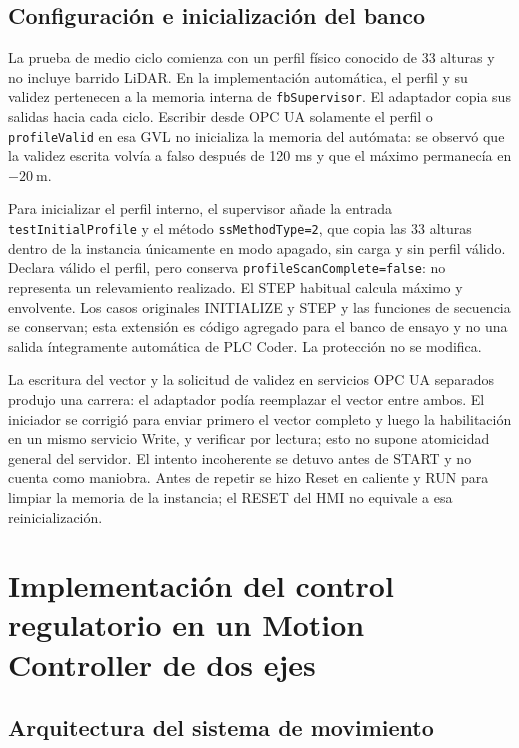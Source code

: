 \documentclass[a4paper,10pt,onecolumn,journal]{ieeeconf}
\numberwithin{equation}{section}
\begin{document}

\subsection{Configuración e inicialización del banco}
La prueba de medio ciclo comienza con un perfil físico conocido de 33 alturas y no incluye barrido LiDAR. En la implementación automática, el perfil y su validez pertenecen a la memoria interna de \texttt{fbSupervisor}. El adaptador copia sus salidas hacia  cada ciclo. Escribir desde OPC UA solamente el perfil o \texttt{profileValid} en esa GVL no inicializa la memoria del autómata: se observó que la validez escrita volvía a falso después de 120 ms y que el máximo permanecía en $-20~\mathrm{m}$.

Para inicializar el perfil interno, el supervisor añade la entrada \texttt{testInitialProfile} y el método \texttt{ssMethodType=2}, que copia las 33 alturas dentro de la instancia únicamente en modo apagado, sin carga y sin perfil válido. Declara válido el perfil, pero conserva \texttt{profileScanComplete=false}: no representa un relevamiento realizado. El STEP habitual calcula máximo y envolvente. Los casos originales INITIALIZE y STEP y las funciones de secuencia se conservan; esta extensión es código agregado para el banco de ensayo y no una salida íntegramente automática de PLC Coder. La protección no se modifica.

La escritura del vector y la solicitud de validez en servicios OPC UA separados produjo una carrera: el adaptador podía reemplazar el vector entre ambos. El iniciador se corrigió para enviar primero el vector completo y luego la habilitación en un mismo servicio Write, y verificar por lectura; esto no supone atomicidad general del servidor. El intento incoherente se detuvo antes de START y no cuenta como maniobra. Antes de repetir se hizo Reset en caliente y RUN para limpiar la memoria de la instancia; el RESET del HMI no equivale a esa reinicialización.

\par
{}
\section{Implementación del control regulatorio en un Motion Controller de dos ejes}
\label{sec:mc_p2}


\subsection{Arquitectura del sistema de movimiento}
\end{document}
